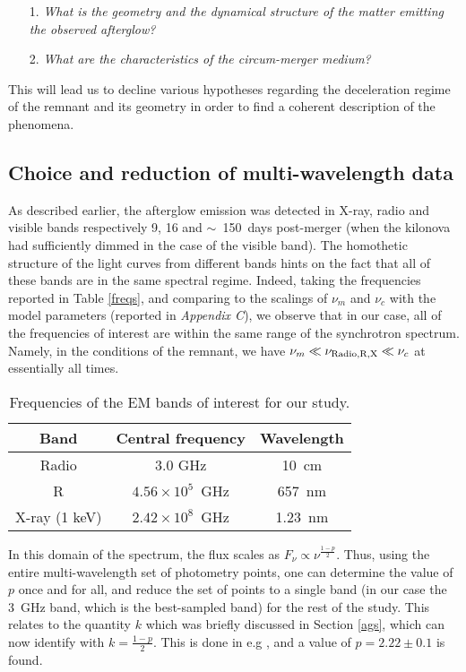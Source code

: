 \begin{itemize}
    \item[1.] \textit{What is the geometry and the dynamical structure of the matter emitting the observed afterglow?}
    \item[2.] \textit{What are the characteristics of the circum-merger medium?}
\end{itemize}

This will lead us to decline various hypotheses regarding the deceleration regime of the remnant and its geometry in order to find a coherent description of the phenomena.

\subsection{Choice and reduction of multi-wavelength data}
As described earlier, the afterglow emission was detected in X-ray, radio and visible bands respectively 9, 16 and $\sim$~150~days  post-merger (when the kilonova had sufficiently dimmed in the case of the visible band). The homothetic structure of the light curves from different bands hints on the fact that all of these bands are in the same spectral regime. Indeed, taking the frequencies reported in Table \ref{freqs}, and comparing to the scalings of $\nu_m$ and $\nu_c$ with the model parameters (reported in \textit{Appendix C}), we observe that in our case, all of the frequencies of interest are within the same range of the synchrotron spectrum. Namely, in the conditions of the remnant, we have $\nu_m \ll \nu_{\rm{Radio, R, X}} \ll \nu_c$ at essentially all times.

\begin{table}
\begin{center}
\begin{tabular}{c|c|c}
\bf{Band} & \bf{Central frequency} & \bf{Wavelength}\\
\hline
Radio & 3.0 GHz & 10~cm\\
R & $4.56\times 10^5$~GHz & 657~nm \\
X-ray (1 keV) & $2.42\times 10^8$~GHz & 1.23~nm \\
\end{tabular}
\caption{Frequencies of the EM bands of interest for our study.}
\label{freq}
\end{center}
\end{table}

In this domain of the spectrum, the flux scales as $F_\nu \propto \nu^{\frac{1 - p}{2}}$. Thus, using the entire multi-wavelength set of photometry points, one can determine the value of $p$ once and for all, and reduce the set of points to a single band (in our case the 3~GHz band, which is the best-sampled band) for the rest of the study. This relates to the quantity $k$ which was briefly discussed in Section \ref{ags}, which can now identify with $k = \frac{1 - p}{2}$. This is done in e.g \citet{5}, and a value of $p = 2.22\pm0.1$ is found.

